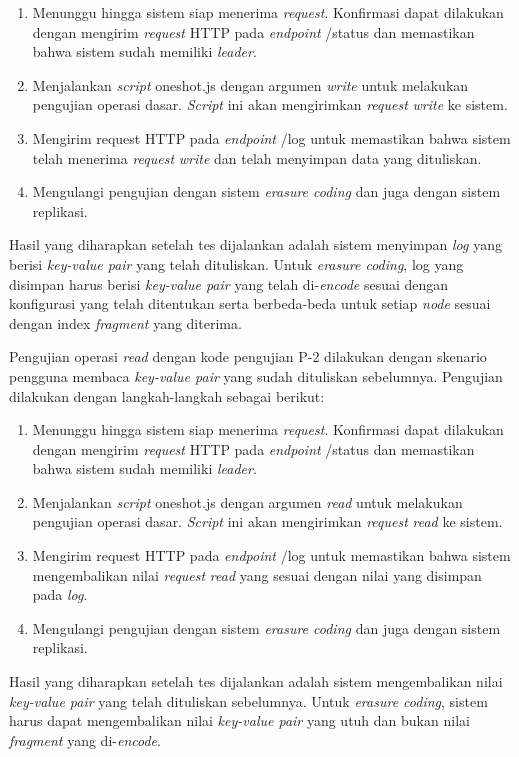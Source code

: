 \begin{enumerate}
  \item Menunggu hingga sistem siap menerima \textit{request}. Konfirmasi dapat dilakukan dengan mengirim \textit{request} HTTP pada \textit{endpoint} /status dan memastikan bahwa sistem sudah memiliki \textit{leader}.
  \item Menjalankan \textit{script} oneshot.js dengan argumen \textit{write} untuk melakukan pengujian operasi dasar. \textit{Script} ini akan mengirimkan \textit{request} \textit{write} ke sistem.
  \item Mengirim request HTTP pada \textit{endpoint} /log untuk memastikan bahwa sistem telah menerima \textit{request} \textit{write} dan telah menyimpan data yang dituliskan.
  \item Mengulangi pengujian dengan sistem \textit{erasure coding} dan juga dengan sistem replikasi.
\end{enumerate}

Hasil yang diharapkan setelah tes dijalankan adalah sistem menyimpan \textit{log} yang berisi \textit{key-value pair} yang telah dituliskan. Untuk \textit{erasure coding}, log yang disimpan harus berisi \textit{key-value pair} yang telah di-\textit{encode} sesuai dengan konfigurasi yang telah ditentukan serta berbeda-beda untuk setiap \textit{node} sesuai dengan index \textit{fragment} yang diterima.

Pengujian operasi \textit{read} dengan kode pengujian P-2 dilakukan dengan skenario pengguna membaca \textit{key-value pair} yang sudah dituliskan sebelumnya. Pengujian dilakukan dengan langkah-langkah sebagai berikut:

\begin{enumerate}
  \item Menunggu hingga sistem siap menerima \textit{request}. Konfirmasi dapat dilakukan dengan mengirim \textit{request} HTTP pada \textit{endpoint} /status dan memastikan bahwa sistem sudah memiliki \textit{leader}.
  \item Menjalankan \textit{script} oneshot.js dengan argumen \textit{read} untuk melakukan pengujian operasi dasar. \textit{Script} ini akan mengirimkan \textit{request} \textit{read} ke sistem.
  \item Mengirim request HTTP pada \textit{endpoint} /log untuk memastikan bahwa sistem mengembalikan nilai \textit{request} \textit{read} yang sesuai dengan nilai yang disimpan pada \textit{log}.
  \item Mengulangi pengujian dengan sistem \textit{erasure coding} dan juga dengan sistem replikasi.
\end{enumerate}

Hasil yang diharapkan setelah tes dijalankan adalah sistem mengembalikan nilai \textit{key-value pair} yang telah dituliskan sebelumnya. Untuk \textit{erasure coding}, sistem harus dapat mengembalikan nilai \textit{key-value pair} yang utuh dan bukan nilai \textit{fragment} yang di-\textit{encode}.